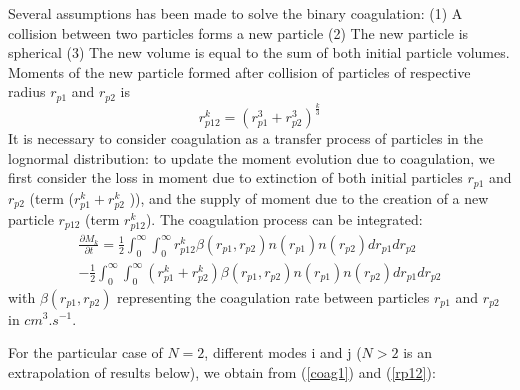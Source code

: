 Several assumptions has been made to solve the binary coagulation:
(1) A collision between two particles forms a new particle
(2) The new particle is spherical
(3) The new volume is equal to the sum of both initial particle volumes.
Moments of the new particle formed after collision of particles of respective radius 
$r_{p1}$ and $r_{p2}$ is 
\begin{equation}
r_{p12}^k = (r_{p1}^3 + r_{p2}^3)^{\frac{k}{3}}
\label{rp12}
\end{equation}
It is necessary to consider coagulation as a transfer process  of particles in 
the lognormal distribution: to update the moment evolution due to coagulation, 
 we first consider the loss in moment due to extinction of 
both initial particles 
 $r_{p1}$ and $r_{p2}$ (term ($r_{p1}^k + r_{p2}^k$ )), and the supply of moment 
due to the
 creation of a new particle  $r_{p12}$ (term  $r_{p12}^k$). 
 The coagulation process can be integrated:
 \begin{eqnarray}
\frac{\partial M_k}{\partial t} = \frac{1}{2} \int_{0}^{\infty} 
\int_{0}^{\infty} r_{p12}^k
\beta(r_{p1},r_{p2}) n(r_{p1}) n(r_{p2}) dr_{p1} dr_{p2} \nonumber \\
- \frac{1}{2} \int_{0}^{\infty} \int_{0}^{\infty} (r_{p1}^k + r_{p2}^k)
\beta(r_{p1},r_{p2}) n(r_{p1}) n(r_{p2})  dr_{p1} dr_{p2}
\label{coag1}
\end{eqnarray}
with $\beta(r_{p1},r_{p2})$ representing the coagulation rate between particles 
$r_{p1}$ and 
$ r_{p2}$ in $cm^3.s^{-1}$.

For the particular case of $N=2$, different modes i and j  ($N > 2$ is an 
extrapolation of results below),  we 
obtain from (\ref{coag1}) and (\ref{rp12}):

